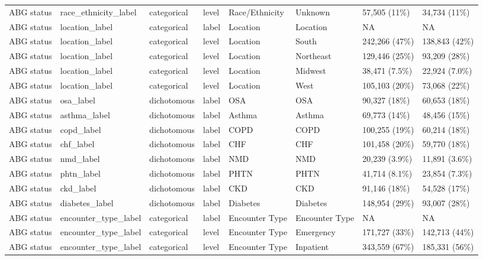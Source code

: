 \documentclass[
  11pt,
  letterpaper,
  DIV=11,
  numbers=noendperiod]{scrartcl}
\begin{document}
\begin{landscape}
\begin{table}[!h]
{\begin{tabular}{llllllll}
ABG status & race\_ethnicity\_label & categorical & level & Race/Ethnicity & Unknown & 57,505 (11\%) & 34,734 (11\%)\\
ABG status & location\_label & categorical & label & Location & Location & NA & NA\\
ABG status & location\_label & categorical & level & Location & South & 242,266 (47\%) & 138,843 (42\%)\\
\addlinespace
ABG status & location\_label & categorical & level & Location & Northeast & 129,446 (25\%) & 93,209 (28\%)\\
ABG status & location\_label & categorical & level & Location & Midwest & 38,471 (7.5\%) & 22,924 (7.0\%)\\
ABG status & location\_label & categorical & level & Location & West & 105,103 (20\%) & 73,068 (22\%)\\
ABG status & osa\_label & dichotomous & label & OSA & OSA & 90,327 (18\%) & 60,653 (18\%)\\
ABG status & asthma\_label & dichotomous & label & Asthma & Asthma & 69,773 (14\%) & 48,456 (15\%)\\
\addlinespace
ABG status & copd\_label & dichotomous & label & COPD & COPD & 100,255 (19\%) & 60,214 (18\%)\\
ABG status & chf\_label & dichotomous & label & CHF & CHF & 101,458 (20\%) & 59,770 (18\%)\\
ABG status & nmd\_label & dichotomous & label & NMD & NMD & 20,239 (3.9\%) & 11,891 (3.6\%)\\
ABG status & phtn\_label & dichotomous & label & PHTN & PHTN & 41,714 (8.1\%) & 23,854 (7.3\%)\\
ABG status & ckd\_label & dichotomous & label & CKD & CKD & 91,146 (18\%) & 54,528 (17\%)\\
\addlinespace
ABG status & diabetes\_label & dichotomous & label & Diabetes & Diabetes & 148,954 (29\%) & 93,007 (28\%)\\
ABG status & encounter\_type\_label & categorical & label & Encounter Type & Encounter Type & NA & NA\\
ABG status & encounter\_type\_label & categorical & level & Encounter Type & Emergency & 171,727 (33\%) & 142,713 (44\%)\\
ABG status & encounter\_type\_label & categorical & level & Encounter Type & Inpatient & 343,559 (67\%) & 185,331 (56\%)\\
\bottomrule
\end{tabular}}
\endgroup{}
\end{table}


\end{landscape}
\end{document}
